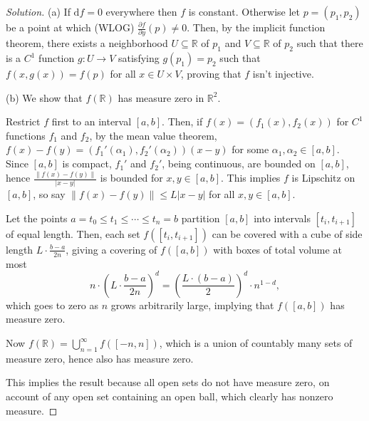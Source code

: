 \documentclass[10pt]{scrartcl}
\providecommand{\RR}{\mathbb R}
\newenvironment{soln}{\begin{proof}[Solution]}{\end{proof}}
\begin{document}
\begin{soln}
	(a) If $\mathrm df = 0$ everywhere then $f$ is constant.
	Otherwise let $p = (p_1, p_2)$ be a point at which (WLOG)
	$\frac{\partial f}{\partial y}(p)\ne 0$.
	Then, by the implicit function theorem,
	there exists a neighborhood $U\subseteq\RR$ of $p_1$ and $V\subseteq\RR$
	of $p_2$ such that there is a $C^1$ function $g\colon U\to V$
	satisfying $g(p_1) = p_2$ such that $f(x, g(x)) = f(p)$
	for all $x\in U\times V$, proving that $f$ isn't injective.

	(b) We show that $f(\RR)$ has measure zero in $\RR^2$.
	
	Restrict $f$ first to an interval $[a,b]$.
	Then, if $f(x) = (f_1(x), f_2(x))$ for
	$C^1$ functions $f_1$ and $f_2$, by the mean value theorem,
	$f(x) - f(y) = (f_1'(\alpha_1), f_2'(\alpha_2))(x - y)$
	for some $\alpha_1,\alpha_2\in[a,b]$. Since $[a,b]$ is compact,
	$f_1'$ and $f_2'$, being continuous, are bounded on $[a,b]$,
	hence $\frac{\|f(x) - f(y)\|}{|x-y|}$ is bounded for $x,y\in[a,b]$.
	This implies $f$ is Lipschitz on $[a,b]$,
	so say $\|f(x)-f(y)\|\le L|x-y|$ for all $x,y\in[a,b]$.
	
	Let the points $a = t_0 \le t_1\le\cdots\le t_n=b$
	partition $[a,b]$ into intervals $[t_i, t_{i+1}]$ of equal length.
	Then, each set $f([t_i, t_{i+1}])$ can be covered with
	a cube of side length $L\cdot\frac{b-a}{2n}$, giving a covering
	of $f([a,b])$ with boxes of total volume at most
	\[n\cdot\left(L\cdot\frac{b-a}{2n}\right)^d =
	\left(\frac{L\cdot(b-a)}{2}\right)^d\cdot n^{1-d},\]
	which goes to zero as $n$ grows arbitrarily large,
	implying that $f([a,b])$ has measure zero.
	
	Now $f(\RR) = \bigcup_{n=1}^\infty f([-n,n])$,
	which is a union of countably many sets of measure zero,
	hence also has measure zero.
	
	This implies the result because all open sets do not have measure zero,
	on account of any open set containing an open ball,
	which clearly has nonzero measure.
\end{soln}
\end{document}
